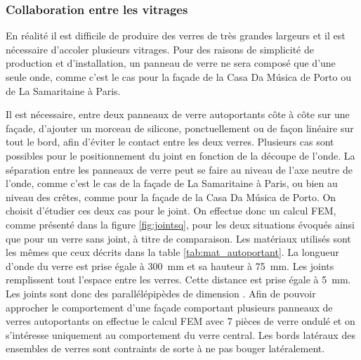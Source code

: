 \documentclass[11pt,titlepage]{article}
\begin{document}
\subsubsection{Collaboration entre les vitrages}

En réalité il est difficile de produire des verres de très grandes largeurs et il est nécessaire d'accoler plusieurs vitrages. Pour des raisons de simplicité de production et d'installation, un panneau de verre ne sera composé que d'une seule onde, comme c'est le cas pour la façade de la Casa Da Música de Porto ou de La Samaritaine à Paris.

Il est nécessaire, entre deux panneaux de verre autoportants côte à côte sur une façade, d'ajouter un morceau de silicone, ponctuellement ou de façon linéaire sur tout le bord, afin d'éviter le contact entre les deux verres. Plusieurs cas sont possibles pour le positionnement du joint en fonction de la découpe de l'onde. La séparation entre les panneaux de verre peut se faire au niveau de l'axe neutre de l'onde, comme c'est le cas de la façade de La Samaritaine à Paris, ou bien au niveau des crêtes, comme pour la façade de la Casa Da Música de Porto. On choisit d'étudier ces deux cas pour le joint. On effectue donc un calcul \acrshort{FEM}, comme présenté dans la figure \ref{fig:jointsq}, pour les deux situations évoqués ainsi que pour un verre sans joint, à titre de comparaison. Les matériaux utilisés sont les mêmes que ceux décrits dans la table \ref{tab:mat_autoportant}. La longueur d'onde du verre est prise égale à \qty{300}{\milli\metre} et sa hauteur à \qty{75}{\milli\metre}. Les joints remplissent tout l'espace entre les verres. Cette distance est prise égale à \qty{5}{\milli\meter}. Les joints sont donc des parallélépipèdes de dimension . Afin de pouvoir approcher le comportement d'une façade comportant plusieurs panneaux de verres autoportants on effectue le calcul \acrshort{FEM} avec 7 pièces de verre ondulé et on s'intéresse uniquement au comportement du verre central. Les bords latéraux des ensembles de verres sont contraints de sorte à ne pas bouger latéralement.
\end{document}
